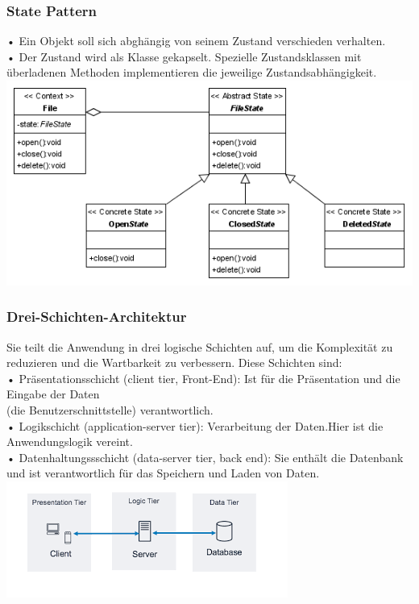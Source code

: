\documentclass{article}
\begin{document}
\begin{enumerate}[label=\alph*)]
   \subsubsection*{State Pattern}
   • Ein Objekt soll sich abghängig von seinem Zustand verschieden verhalten.\\
   • Der Zustand wird als Klasse gekapselt. Spezielle Zustandsklassen mit überladenen Methoden implementieren die jeweilige Zustandsabhängigkeit.\\
   \includegraphics[scale=0.45]{media/statePattern.png}
   
   \subsubsection*{Drei-Schichten-Architektur}
   Sie teilt die Anwendung in drei logische Schichten auf, um die Komplexität zu reduzieren und die Wartbarkeit zu verbessern. Diese Schichten sind:\\
   • Präsentationsschicht (client tier, Front-End): Ist für die Präsentation und die Eingabe der Daten \\(die Benutzerschnittstelle) verantwortlich.\\
   • Logikschicht (application-server tier): Verarbeitung der Daten.Hier ist die Anwendungslogik vereint.\\
   • Datenhaltungssschicht (data-server tier, back end): Sie enthält die Datenbank und ist verantwortlich für das Speichern und Laden von Daten.\\
	\includegraphics[scale=0.6]{media/3LayerArch.png}
	

\end{enumerate}
\end{document}
